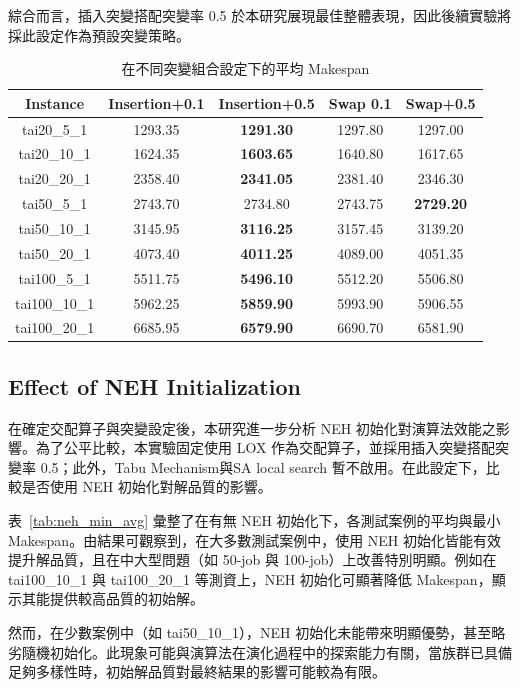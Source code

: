 \documentclass[conference]{IEEEtran}
\begin{document}
綜合而言，插入突變搭配突變率 0.5 於本研究展現最佳整體表現，因此後續實驗將採此設定作為預設突變策略。
\begin{table}[H]
\centering
\caption{在不同突變組合設定下的平均 Makespan}
\label{tab:mutation_settings}
\begin{tabular}{c|c|c|c|c}
\hline
Instance & Insertion+0.1 & Insertion+0.5 & Swap 0.1 & Swap+0.5 \\
\hline
tai20\_5\_1   & 1293.35 & \textbf{1291.30} & 1297.80 & 1297.00 \\
tai20\_10\_1  & 1624.35 & \textbf{1603.65} & 1640.80 & 1617.65 \\
tai20\_20\_1  & 2358.40 & \textbf{2341.05} & 2381.40 & 2346.30 \\
tai50\_5\_1   & 2743.70 & 2734.80 & 2743.75 & \textbf{2729.20} \\
tai50\_10\_1  & 3145.95 & \textbf{3116.25} & 3157.45 & 3139.20 \\
tai50\_20\_1  & 4073.40 & \textbf{4011.25} & 4089.00 & 4051.35 \\
tai100\_5\_1  & 5511.75 & \textbf{5496.10} & 5512.20 & 5506.80 \\
tai100\_10\_1 & 5962.25 & \textbf{5859.90} & 5993.90 & 5906.55 \\
tai100\_20\_1 & 6685.95 & \textbf{6579.90} & 6690.70 & 6581.90 \\
\hline
\end{tabular}
\end{table}

\subsection{Effect of NEH Initialization}
在確定交配算子與突變設定後，本研究進一步分析 NEH 初始化對演算法效能之影響。為了公平比較，本實驗固定使用 LOX 作為交配算子，並採用插入突變搭配突變率 0.5；此外，Tabu Mechanism與SA local search 暫不啟用。在此設定下，比較是否使用 NEH 初始化對解品質的影響。

表~\ref{tab:neh_min_avg} 彙整了在有無 NEH 初始化下，各測試案例的平均與最小 Makespan。由結果可觀察到，在大多數測試案例中，使用 NEH 初始化皆能有效提升解品質，且在中大型問題（如 50-job 與 100-job）上改善特別明顯。例如在 tai100\_10\_1 與 tai100\_20\_1 等測資上，NEH 初始化可顯著降低 Makespan，顯示其能提供較高品質的初始解。

然而，在少數案例中（如 tai50\_10\_1），NEH 初始化未能帶來明顯優勢，甚至略劣隨機初始化。此現象可能與演算法在演化過程中的探索能力有關，當族群已具備足夠多樣性時，初始解品質對最終結果的影響可能較為有限。
\end{document}
